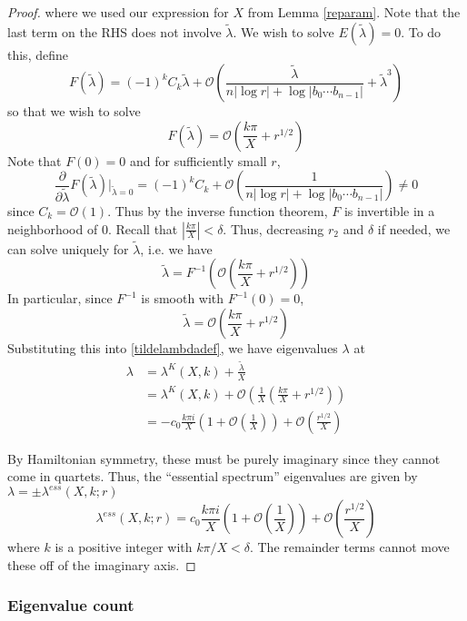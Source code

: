 \documentclass[thesis.tex]{subfiles}
\begin{document}
\begin{lemma}
\begin{proof}
where we used our expression for $X$ from Lemma \ref{reparam}. Note that the last term on the RHS does not involve $\tilde{\lambda}$. We wish to solve $E(\tilde{\lambda}) = 0$. To do this, define
\[
F(\tilde{\lambda}) = (-1)^k C_k \tilde{\lambda} + \mathcal{O}\left( \frac{\tilde{\lambda}}{n|\log r| + \log|b_0\cdots b_{n-1}|} + \tilde{\lambda}^3 \right)
\]
so that we wish to solve
\[
F(\tilde{\lambda}) = \mathcal{O} \left( \frac{k \pi}{X} + r^{1/2} \right)
\]
Note that $F(0) = 0$ and for sufficiently small $r$, 
\[
\frac{\partial}{\partial\tilde{\lambda}}F(\tilde{\lambda})\big|_{\tilde{\lambda} = 0}
= (-1)^k C_k + \mathcal{O}\left( \frac{1}{n|\log r| + \log|b_0\cdots b_{n-1}|} \right) \neq 0
\]
since $C_k = \mathcal{O}(1)$. Thus by the inverse function theorem, $F$ is invertible in a neighborhood of 0. Recall that $|\frac{k \pi}{X}| < \delta$. Thus, decreasing $r_2$ and $\delta$ if needed, we can solve uniquely for $\tilde{\lambda}$, i.e. we have
\[
\tilde{\lambda} = F^{-1}\left( \mathcal{O} \left( \frac{k \pi}{X} + r^{1/2} \right)\right)
\]
In particular, since $F^{-1}$ is smooth with $F^{-1}(0) = 0$,
\[
\tilde{\lambda} = \mathcal{O}\left( \frac{k \pi}{X} + r^{1/2} \right)
\]
Substituting this into \eqref{tildelambdadef}, we have eigenvalues $\lambda$ at
\begin{align*}
\lambda &= \lambda^K(X,k) + \frac{\tilde{\lambda}}{X} \\
&= \lambda^K(X,k) + \mathcal{O}\left( \frac{1}{X} \left( \frac{k \pi}{X} + r^{1/2} \right) \right)\\
&= -c_0 \frac{k \pi i }{X} \left( 1 + \mathcal{O}\left( \frac{1}{X} \right)\right) + \mathcal{O}\left( \frac{r^{1/2}}{X} \right)
\end{align*}

By Hamiltonian symmetry, these must be purely imaginary since they cannot come in quartets. Thus, the ``essential spectrum'' eigenvalues are given by $\lambda = \pm \lambda^{ess}(X, k; r)$
\[
\lambda^{ess}(X, k; r) = c_0 \frac{k \pi i }{X} \left( 1 + \mathcal{O}\left( \frac{1}{X} \right)\right) + \mathcal{O}\left( \frac{r^{1/2}}{X} \right)
\]
where $k$ is a positive integer with $k \pi/X < \delta$. The remainder terms cannot move these off of the imaginary axis.
\end{proof}
\end{lemma}

\subsubsection{Eigenvalue count}
\end{document}
